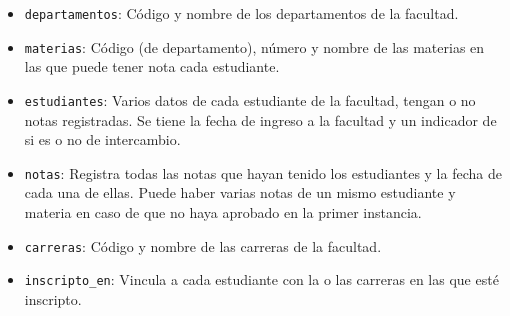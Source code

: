 \documentclass[12pt]{amsart}
\begin{document}
\begin{enumerate}
\begin{center}
\begin{itemize}
        \item \texttt{departamentos}: Código y nombre de los departamentos de la facultad.\\
        \item \texttt{materias}: Código (de departamento), número y nombre de las materias en las que puede tener nota cada estudiante.\\
        \item \texttt{estudiantes}: Varios datos de cada estudiante de la facultad, tengan o no notas registradas. Se tiene la fecha de ingreso a la facultad y un indicador de si es o no de intercambio.\\
        \item \texttt{notas}: Registra todas las notas que hayan tenido los estudiantes y la fecha de cada una de ellas. Puede haber varias notas de un mismo estudiante y materia en caso de que no haya aprobado en la primer instancia.\\
        \item \texttt{carreras}: Código y nombre de las carreras de la facultad.\\
        \item \texttt{inscripto\_en}: Vincula a cada estudiante con la o las carreras en las que esté inscripto.\\
\end{itemize}
\end{center}

\vspace{0.3cm}

\begin{center}
\end{center}

\end{enumerate}
\end{document}
